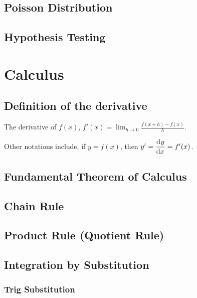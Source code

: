 \documentclass[a4paper,11pt]{article}
\begin{document}
    \subsection{Poisson Distribution}

    \subsection{Hypothesis Testing}


    \section{Calculus}


    \subsection{Definition of the derivative}

    The derivative of $f(x)$,
    $\displaystyle f'(x) = \lim_{h \to 0} \frac{f(x + h) - f(x)}{h}$.

    Other notations include, if $y = f(x)$, then
    $y' = \dod yx = f'(x)$.

    \subsection{Fundamental Theorem of Calculus} \label{sec:calc_FTC}

    \subsection{Chain Rule} \label{sec:calc_chain}

    \subsection{Product Rule (Quotient Rule)} \label{sec:calc_product}

    \subsection{Integration by Substitution} \label{sec:calc_substitution}

    \subsubsection{Trig Substitution} \label{sec:calc_trig_substitution}
\end{document}
